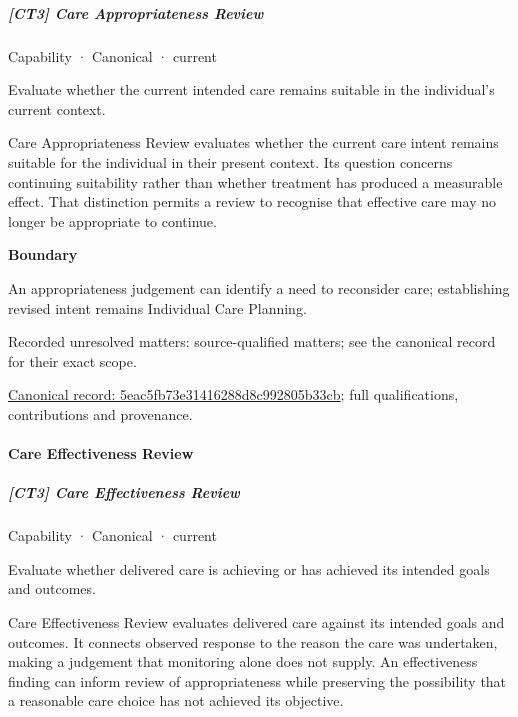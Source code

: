 \subparagraph{[CT3] Care Appropriateness Review}

\label{element:5eac5fb73e31416288d8c992805b33cb}
{\small Capability · Canonical · current}\par

Evaluate whether the current intended care remains suitable in the individual’s current context.



Care Appropriateness Review evaluates whether the current care intent remains suitable for the individual in their present context. Its question concerns continuing suitability rather than whether treatment has produced a measurable effect. That distinction permits a review to recognise that effective care may no longer be appropriate to continue.



\textbf{Boundary}



An appropriateness judgement can identify a need to reconsider care; establishing revised intent remains Individual Care Planning.


{\small Recorded unresolved matters: source-qualified matters; see the canonical record for their exact scope.}\par
{\footnotesize \href{../../../../continuum/strategy/capability/5eac5fb73e31416288d8c992805b33cb.md}{Canonical record: 5eac5fb73e31416288d8c992805b33cb}; full qualifications, contributions and provenance.}\par
\paragraph{Care Effectiveness Review}

\subparagraph{[CT3] Care Effectiveness Review}

\label{element:79cfeaefeb174a54ba43343d37f035c1}
{\small Capability · Canonical · current}\par

Evaluate whether delivered care is achieving or has achieved its intended goals and outcomes.



Care Effectiveness Review evaluates delivered care against its intended goals and outcomes. It connects observed response to the reason the care was undertaken, making a judgement that monitoring alone does not supply. An effectiveness finding can inform review of appropriateness while preserving the possibility that a reasonable care choice has not achieved its objective.



